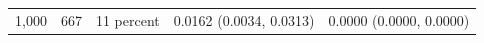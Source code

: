 \begin{tabular}{rrrrr}
1,000 & 667 & 11 percent & 0.0162 (0.0034, 0.0313) & 0.0000 (0.0000, 0.0000) \\

\end{tabular}
